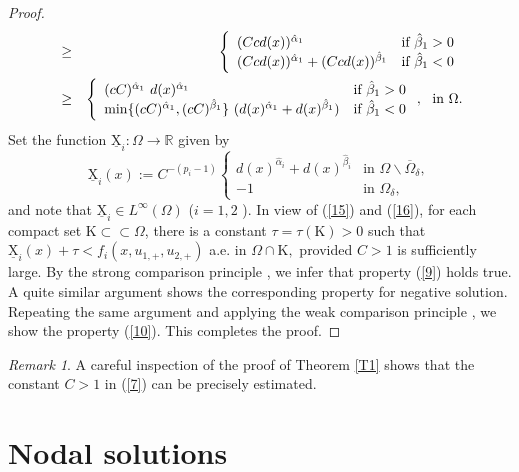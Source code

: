 \documentclass[11pt]{amsart}
\theoremstyle{definition}
\theoremstyle{remark}
\newtheorem{remark}[theorem]{Remark}
\numberwithin{equation}{section}
\begin{document}
\begin{proof}
\begin{eqnarray*}
&\geq &\left\{ 
\begin{array}{ll}
(Ccd(x))^{\hat{\alpha}_{1}} & \text{if }\hat{\beta}_{1}>0 \\ 
(Ccd(x))^{\hat{\alpha}_{1}}+(Ccd(x))^{\hat{\beta}_{1}} & \text{if }\hat{\beta%
}_{1}<0%
\end{array}%
\right. \\
&\geq &\left\{ 
\begin{array}{ll}
(cC)^{\hat{\alpha}_{1}}\text{ }d(x)^{\hat{\alpha}_{1}} & \text{if }\hat{\beta%
}_{1}>0 \\ 
\min \{(cC)^{\hat{\alpha}_{1}},(cC)^{\hat{\beta}_{1}}\}\text{ }(d(x)^{\hat{%
\alpha}_{1}}+d(x)^{\hat{\beta}_{1}}) & \text{if }\hat{\beta}_{1}<0%
\end{array}%
\right. ,\text{ \ in }\Omega .
\end{eqnarray*}%
Set the function $\underline{\mathrm{X}}_{i}:\Omega \rightarrow \mathbb{R}$
given by 
\begin{equation*}
\underline{\mathrm{X}}_{i}(x):=C^{-(p_{i}-1)}\left\{ 
\begin{array}{ll}
d(x)^{\hat{\alpha}_{i}}+d(x)^{\hat{\beta}_{i}} & \text{in \ }\Omega
\backslash \overline{\Omega }_{\delta }, \\ 
-1 & \text{in \ }\Omega _{\delta },%
\end{array}%
\right.
\end{equation*}%
and note that $\underline{\mathrm{X}}_{i}\in L^{\infty }(\Omega )$ ($i=1,2$
). In view of (\ref{15}) and (\ref{16}), for each compact set $\mathrm{K}%
\subset \subset \Omega $, there is a constant $\tau =\tau (\mathrm{K})>0$
such that $\underline{\mathrm{X}}_{i}(x)+\tau <f{_{i}}({x,}u_{1,+},u_{2,+})$
a.e. in $\Omega \cap \mathrm{K},$ provided $C>1$ is sufficiently large. By
the strong comparison principle \cite[Proposition 2.6]{AR}, we infer that
property (\ref{9}) holds true. A quite similar argument shows the
corresponding property for negative solution. Repeating the same argument
and applying the weak comparison principle \cite[Proposition 2.6]{AR}, we
show the property (\ref{10}). This completes the proof.
\end{proof}

\begin{remark}
A careful inspection of the proof of Theorem \ref{T1} shows that the
constant $C>1$ in (\ref{7}) can be precisely estimated.
\end{remark}

\section{Nodal solutions}
\end{document}
